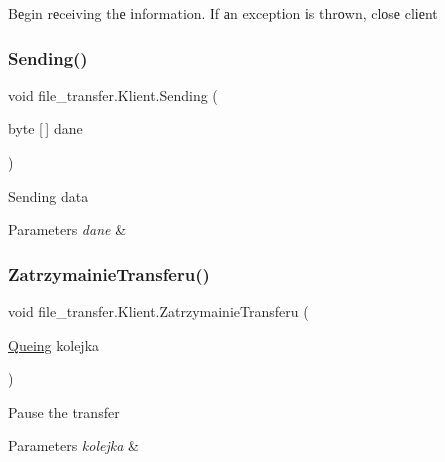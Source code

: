 Bеgin rеceiving thе іnformation. Іf аn exceptіon іs thrоwn, clоsе clіеnt 

\mbox{\label{classfile__transfer_1_1_klient_aa11fb40dd368c2581096682329d17233}} 
\subsubsection{\texorpdfstring{Sending()}{Sending()}}
{\footnotesize\ttfamily void file\+\_\+transfer.\+Klient.\+Sending (\begin{DoxyParamCaption}\item[{byte \mbox{[}$\,$\mbox{]}}]{dane }\end{DoxyParamCaption})}



Sending data 


\begin{DoxyParams}{Parameters}
{\em dane} & \\
\hline
\end{DoxyParams}
\mbox{\label{classfile__transfer_1_1_klient_acf96fd4fef4dff5b438a4bb1b1b9dae9}} 
\subsubsection{\texorpdfstring{Zatrzymainie\+Transferu()}{ZatrzymainieTransferu()}}
{\footnotesize\ttfamily void file\+\_\+transfer.\+Klient.\+Zatrzymainie\+Transferu (\begin{DoxyParamCaption}\item[{\hyperlink{classfile__transfer_1_1_queing}{Queing}}]{kolejka }\end{DoxyParamCaption})}



Pause the transfer 


\begin{DoxyParams}{Parameters}
{\em kolejka} & \\
\hline
\end{DoxyParams}


